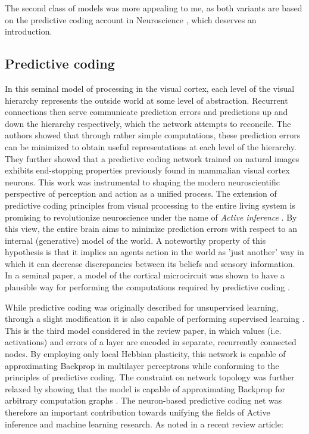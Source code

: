 The second class of models was more appealing to me, as both variants are based on the predictive coding account in
Neuroscience \citep{rao1999predictive}, which deserves an introduction.

\subsection{Predictive coding}

In this seminal model of processing in the visual cortex, each level of the visual hierarchy represents the outside
world at some level of abstraction. Recurrent connections then serve communicate prediction errors and predictions up
and down the hierarchy respectively, which the network attempts to reconcile. The authors showed that through rather
simple computations, these prediction errors can be minimized to obtain useful representations at each level of the
hierarchy. They further showed that a predictive coding network trained on natural images exhibits end-stopping
properties previously found in mammalian visual cortex neurons. This work was instrumental to shaping the modern
neuroscientific perspective of perception and action as a unified process. The extension of predictive coding principles
from visual processing to the entire living system is promising to revolutionize neuroscience under the name of
\textit{Active inference} \citep{Friston2008,Friston2009,Adams2015}. By this view, the entire brain aims to minimize
prediction errors with respect to an internal (generative) model of the world. A noteworthy property of this hypothesis
is that it implies an agents action in the world as 'just another' way in which it can decrease discrepancies between
its beliefs and sensory information. In a seminal paper, a model of the cortical microcircuit
\citep{haeusler2007statistical} was shown to have a plausible way for performing the computations required by predictive
coding \citep{bastos2012canonical}.

While predictive coding was originally described for unsupervised learning, through a slight modification it is also
capable of performing supervised learning \citep{Whittington2017}. This is the third model considered in the review
paper, in which values (i.e. activations) and errors of a layer are encoded in separate, recurrently connected nodes. By
employing only local Hebbian plasticity, this network is capable of approximating Backprop in multilayer perceptrons
while conforming to the principles of predictive coding. The constraint on network topology was further relaxed by
showing that the model is capable of approximating Backprop for arbitrary computation graphs \citep{Millidge2022}. The
neuron-based predictive coding net was therefore an important contribution towards unifying the fields of Active
inference and machine learning research. As noted in a recent review article:

